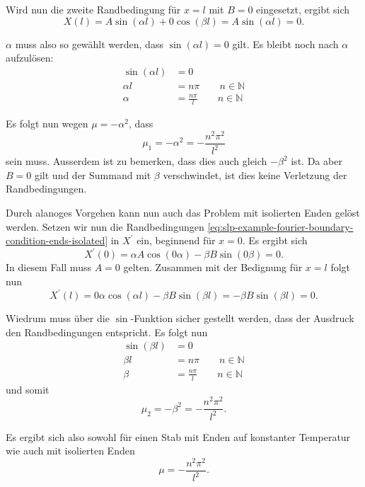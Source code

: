 Wird nun die zweite Randbedingung für $x = l$ mit $B = 0$ eingesetzt, ergibt
sich
\[
    X(l)
    =
    A \sin(\alpha l) + 0 \cos(\beta l)
    =
    A \sin(\alpha l)
    = 0.
\]

$\alpha$ muss also so gewählt werden, dass $\sin(\alpha l) = 0$ gilt.
Es bleibt noch nach $\alpha$ aufzulösen:
\[
\begin{aligned}
    \sin(\alpha l) &= 0 \\
    \alpha l &= n \pi \qquad n \in \mathbb{N} \\
    \alpha &= \frac{n \pi}{l} \qquad n \in \mathbb{N}
\end{aligned}
\]

Es folgt nun wegen $\mu = -\alpha^{2}$, dass
\begin{equation}
    \mu_1 = -\alpha^{2} = -\frac{n^{2}\pi^{2}}{l^{2}}
\end{equation}
sein muss.
Ausserdem ist zu bemerken, dass dies auch gleich $-\beta^{2}$ ist.
Da aber $B = 0$ gilt und der Summand mit $\beta$ verschwindet, ist dies keine
Verletzung der Randbedingungen.

Durch alanoges Vorgehen kann nun auch das Problem mit isolierten Enden gelöst
werden.
Setzen wir nun die Randbedingungen
\eqref{eq:slp-example-fourier-boundary-condition-ends-isolated} in $X^{\prime}$
ein, beginnend für $x = 0$. Es ergibt sich
\[
    X^{\prime}(0)
    =
    \alpha A \cos(0 \alpha) - \beta B \sin(0 \beta)
    = 0.
\]
In diesem Fall muss $A = 0$ gelten.
Zusammen mit der Bedignung für $x = l$
folgt nun
\[
    X^{\prime}(l)
    =
    0 \alpha \cos(\alpha l) - \beta B \sin(\beta l)
    =
    -\beta B \sin(\beta l)
    = 0.
\]

Wiedrum muss über die $ \sin $-Funktion sicher gestellt werden, dass der
Ausdruck den Randbedingungen entspricht.
Es folgt nun
\[
\begin{aligned}
    \sin(\beta l) &= 0 \\
    \beta l &= n \pi \qquad n \in \mathbb{N} \\
    \beta &= \frac{n \pi}{l} \qquad n \in \mathbb{N}
\end{aligned}
\]
und somit
\[
    \mu_2 = -\beta^{2} = -\frac{n^{2}\pi^{2}}{l^{2}}.
\]

Es ergibt sich also sowohl für einen Stab mit Enden auf konstanter Temperatur
wie auch mit isolierten Enden
\begin{equation}
    \label{eq:slp-example-fourier-mu-solution}
    \mu
    =
    -\frac{n^{2}\pi^{2}}{l^{2}}.
\end{equation}

